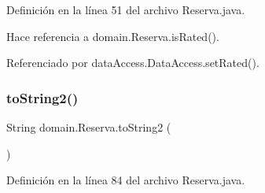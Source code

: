 Definición en la línea 51 del archivo Reserva.\+java.


\begin{DoxyCode}{0}

\end{DoxyCode}


Hace referencia a domain.\+Reserva.\+is\+Rated().



Referenciado por data\+Access.\+Data\+Access.\+set\+Rated().

\mbox{\label{classdomain_1_1_reserva_a67f6dd7c4aee04c6e45e2d22b59c5b2f}} 
\subsubsection{\texorpdfstring{toString2()}{toString2()}}
{\footnotesize\ttfamily String domain.\+Reserva.\+to\+String2 (\begin{DoxyParamCaption}{ }\end{DoxyParamCaption})}



Definición en la línea 84 del archivo Reserva.\+java.


